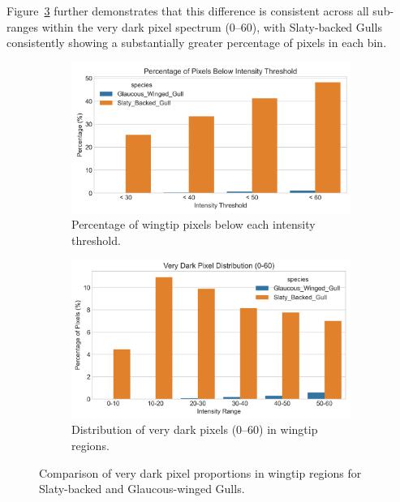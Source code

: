 \documentclass[a4paper,12pt]{report}
\begin{document}
Figure~\ref{fig:verydarkdist} further demonstrates that this difference is consistent across all sub-ranges within the very dark pixel spectrum (0--60), with Slaty-backed Gulls consistently showing a substantially greater percentage of pixels in each bin.


\begin{figure}[H]
    \centering
    \begin{subfigure}[b]{0.48\textwidth}
        \includegraphics[width=\textwidth]{images/REPORT_IMAGES_INTENSITY/I2/pixelsbelowthresh.png}
        \caption{Percentage of wingtip pixels below each intensity threshold.}
        \label{fig:pixels_below_thresh}
    \end{subfigure}
    \hfill
    \begin{subfigure}[b]{0.48\textwidth}
        \includegraphics[width=\textwidth]{images/REPORT_IMAGES_INTENSITY/I2/verydarkdist.png}
        \caption{Distribution of very dark pixels (0--60) in wingtip regions.}
        \label{fig:verydarkdist}
    \end{subfigure}
    \caption{Comparison of very dark pixel proportions in wingtip regions for Slaty-backed and Glaucous-winged Gulls.}
\end{figure}
\end{document}
